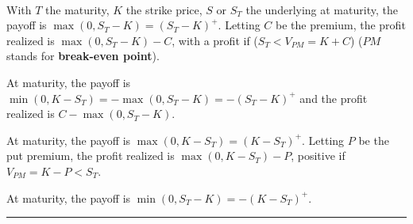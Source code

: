 \begin{f}

\ %


With $T$ the maturity, $K$ the strike price, $S$ or $S_T$ the underlying at maturity, the payoff is $\max (0, S_T-K)=( S_T-K)^{+}$.
Letting $C$ be the premium, the profit realized is $\max (0, S_T-K)-C$, with a profit if ($S_T<V_{PM}=K + C$) ($PM$ stands for \textbf{break-even point}).

		


\medskip



At maturity, the payoff is $\min (0,K- S_T)=-\max(0, S_T-K)=-( S_T-K)^{+}$ and the profit realized is $C-\max (0, S_T-K)$.

\medskip

		
\medskip



At maturity, the payoff is $\max (0,K- S_T)=(K- S_T)^{+}$.
Letting $P$ be the put premium, the profit realized is $\max (0,K- S_T)-P$, positive if $V_{PM}=K -P<S_T$.

\medskip

	    	     


\medskip

	    	     

At maturity, the payoff is $\min (0, S_T-K)=-(K- S_T)^+$.


\end{f}
\hrule

